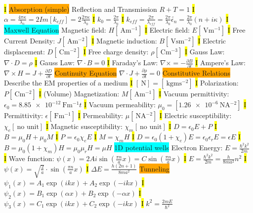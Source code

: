 \documentclass[fontsize=3]{scrartcl}
\begin{document}
\hl{I}
\colorbox{Orange}{Absorption (simple)}
Reflection and Transmission $R + T =1$
\hl{I}
$\alpha = \frac{4\pi \kappa}{\lambda_0} = 2Im[k_{eff}] = 2\frac{2\pi \kappa}{\lambda_0}$
\hl{I}
$k_0 = \frac{2\pi}{\lambda_0}$
\hl{I}
$k_{eff} = \frac{2\pi}{\lambda_{eff}} = \frac{2\pi}{\lambda_0} \widetilde{\epsilon_n} = \frac{2\pi}{\lambda_0}(n + i\kappa)$
\hl{I}
\colorbox{Cyan}{Maxwell Equation}
Magnetic field: $H  [\SI{} {\ampere \meter^{-1}}] $ 
\hl{I}
Electric field: $E  [\SI{} {\volt \meter^{-1}}] $ 
\hl{I}
Free Current Density: $J  [\SI{} {\ampere \meter^{-2}}] $ 
\hl{I}
Magnetic induction: $B  [\SI{} {\volt \second \meter^{-2}}] $ 
\hl{I}
Electric displacement: $D  [\SI{} {\coulomb \meter^{-2}}] $ 
\hl{I}
Free charge density: $\rho  [\SI{} {\coulomb \meter^{-3}}] $ 
\hl{I}
Gauss Law: $\nabla \cdot D = \rho$
\hl{I}
Gauss Law: $\nabla \cdot B = 0$
\hl{I}
Faraday's Law: $\nabla \times = -\frac{\partial B}{\partial t}$
\hl{I}
Ampere's Law: $\nabla \times H = J + \frac{\partial D}{\partial t}$
\colorbox{Orange}{Continuity Equation}
$\nabla \cdot J + \frac{\partial \rho}{\partial t} = 0$
\colorbox{Orange}{Constitutive Relations}
Describe the EM properties of a medium
\hl{I}
$[\SI{} {\newton}] = [ \SI{} {\kilogram \meter \second^{-2}}] $ 
\hl{I}
Polarization: $P  [\SI{} {\coulomb \meter^{-2}}] $ 
\hl{I}
(Volume) Magnetization: $M  [\SI{} {\ampere \meter^{-1}}] $ 
\hl{I}
Vacuum permittivity: $\epsilon_0 = \SI{8.85e-12} {\farad \meter^{-1}}t $ 
\hl{I}
Vacuum permeability: $\mu_0  = [\SI{1.26e-6} {\newton \ampere^{-2}}] $ 
\hl{I}
Permittivity: $\epsilon  [\SI{} {\farad \meter^{-1}}] $ 
\hl{I}
Permeability: $\mu  [\SI{} {\newton \ampere^{-2}}] $ 
\hl{I}
Electric susceptibility: $\chi_{e}  [\SI{} {\text{no unit}}] $ 
\hl{I}
Magnetic susceptibility: $\chi_{m}  [\SI{} {\text{no unit}}] $ 
\hl{I}
$D=\epsilon_0 E + P$
\hl{I}
$B=\mu_0 H + \mu_0 M$
\hl{I}
$P=\epsilon_0 \chi_e E$
\hl{I}
$M=\chi_m H$
\hl{I}
$D= \epsilon_0 (1+\chi_e) E = \epsilon_0 \epsilon_r E = \epsilon E$
\hl{I}
$B=\mu_0 (1+\chi_m)H = \mu_0 \mu_r H = \mu H$
\colorbox{Cyan}{1D potential wells}
Electron Energy: $E = \frac{\hbar^2 k^2}{2m}$
\hl{I}
Wave function: $\psi(x) = 2Ai \sin (\frac{\pi n}{a}x) = C \sin(\frac{\pi n}{a}x)$
\hl{I}
$E=\frac{\hbar^2 k^2}{2m} = \frac{h}{8ma^2} n^2$
\hl{I}
$\psi(x) = \sqrt{\frac{2}{a}} \cdot \sin(\frac{\pi n}{a} x)$
\hl{I}
$\Delta E = \frac{h(2n +1)}{8ma^2}$
\colorbox{Orange}{Tunneling}
$\psi_1(x) = A_1 \exp (ikx) + A_2 \exp(-ikx)$
\hl{I}
$\psi_2(x) = B_1 \exp (\alpha x) + B_2 \exp(- \alpha x)$
\hl{I}
$\psi_3(x) = C_1 \exp (ikx) + C_2 \exp(-ikx)$
\hl{I}
$k^2 = \frac{2mE}{\hbar^2}$
\end{document}
